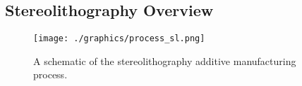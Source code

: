 % 

\subsection{Stereolithography Overview}

\begin{figure}[h!!]
 \centering
 \texttt{[image: ./graphics/process\_sl.png]}
 \caption{A schematic of the stereolithography additive manufacturing process.}
\end{figure}



